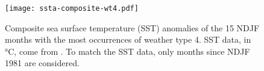 \documentclass[twocol]{ametsoc}
\begin{document}
\begin{figure}
	\noindent\texttt{[image: ssta-composite-wt4.pdf]}
	\caption{
		Composite sea surface temperature (SST) anomalies of the 15 NDJF months with the most occurrences of weather type 4.
		SST data, in \si{\celsius}, come from \citet{Reynolds:2002iy}.
		To match the SST data, only months since NDJF 1981 are considered.
	}
  \label{fig:wt4-months}
\end{figure}
\end{document}
